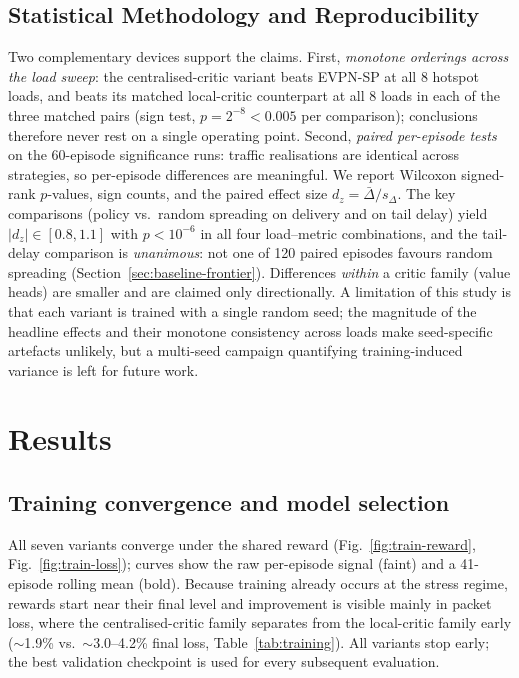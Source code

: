 \documentclass[10pt,journal,comsoc]{IEEEtran}
\begin{document}
\subsection{Statistical Methodology and Reproducibility}
\label{subsec:stats}
Two complementary devices support the claims. First, \emph{monotone orderings across the load sweep}: the centralised-critic variant beats EVPN-SP at all 8 hotspot loads, and beats its matched local-critic counterpart at all 8 loads in each of the three matched pairs (sign test, $p = 2^{-8} < 0.005$ per comparison); conclusions therefore never rest on a single operating point. Second, \emph{paired per-episode tests} on the 60-episode significance runs: traffic realisations are identical across strategies, so per-episode differences are meaningful. We report Wilcoxon signed-rank $p$-values, sign counts, and the paired effect size $d_z = \bar{\Delta}/s_\Delta$. The key comparisons (policy vs.\ random spreading on delivery and on tail delay) yield $|d_z| \in [0.8, 1.1]$ with $p < 10^{-6}$ in all four load--metric combinations, and the tail-delay comparison is \emph{unanimous}: not one of 120 paired episodes favours random spreading (Section~\ref{sec:baseline-frontier}). Differences \emph{within} a critic family (value heads) are smaller and are claimed only directionally. A limitation of this study is that each variant is trained with a single random seed; the magnitude of the headline effects and their monotone consistency across loads make seed-specific artefacts unlikely, but a multi-seed campaign quantifying training-induced variance is left for future work.

\section{Results} \label{sec:results}

\subsection{Training convergence and model selection}
\label{sec:training}
All seven variants converge under the shared reward (Fig.~\ref{fig:train-reward}, Fig.~\ref{fig:train-loss}); curves show the raw per-episode signal (faint) and a 41-episode rolling mean (bold). Because training already occurs at the stress regime, rewards start near their final level and improvement is visible mainly in packet loss, where the centralised-critic family separates from the local-critic family early ($\sim$1.9\% vs.\ $\sim$3.0--4.2\% final loss, Table~\ref{tab:training}). All variants stop early; the best validation checkpoint is used for every subsequent evaluation.
\end{document}
